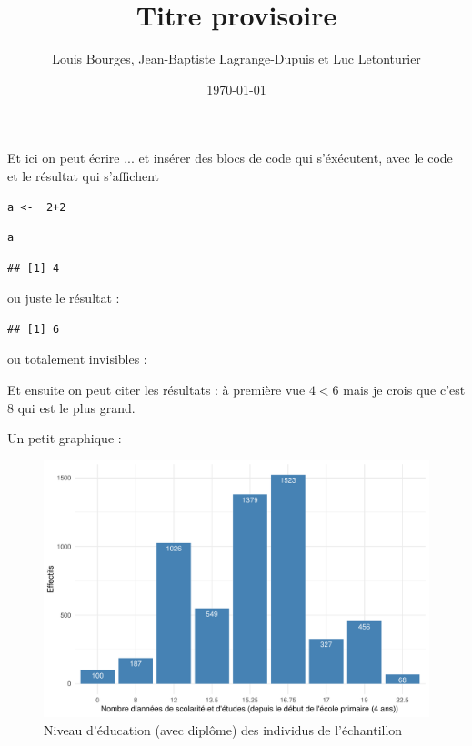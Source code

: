 \documentclass[a4paper, french, 11 pt]{article}\usepackage[]{graphicx}\usepackage[]{xcolor}
\title{Titre provisoire}
\author{Louis Bourges, Jean-Baptiste Lagrange-Dupuis et Luc Letonturier}
\date{\today}
\makeatletter
\newenvironment{kframe}{%
 \def\at@end@of@kframe{}%
 \ifinner\ifhmode%
  \def\at@end@of@kframe{\end{minipage}}%
  \begin{minipage}{\columnwidth}%
 \fi\fi%
 \def\FrameCommand##1{\hskip\@totalleftmargin \hskip-\fboxsep
 \colorbox{shadecolor}{##1}\hskip-\fboxsep
     \hskip-\linewidth \hskip-\@totalleftmargin \hskip\columnwidth}%
 \MakeFramed {\advance\hsize-\width
   \@totalleftmargin\z@ \linewidth\hsize
   \@setminipage}}%
 {\par\unskip\endMakeFramed%
 \at@end@of@kframe}
\newenvironment{knitrout}{}{} %
\makeatother
\begin{document}
\maketitle

Et ici on peut écrire ... et insérer des blocs de code qui s'éxécutent, avec le code et le résultat qui s'affichent

\begin{knitrout}
\color{fgcolor}\begin{kframe}
\begin{lstlisting}[basicstyle=\ttfamily,breaklines=true]
a <-  2+2\end{lstlisting}
\begin{lstlisting}[basicstyle=\ttfamily,breaklines=true]
a\end{lstlisting}
\begin{lstlisting}[basicstyle=\ttfamily,breaklines=true]
## [1] 4
\end{lstlisting}
\end{kframe}
\end{knitrout}

ou juste le résultat : 

\begin{knitrout}
\color{fgcolor}\begin{kframe}
\begin{lstlisting}[basicstyle=\ttfamily,breaklines=true]
## [1] 6
\end{lstlisting}
\end{kframe}
\end{knitrout}

ou totalement invisibles : 


Et ensuite on peut citer les résultats : à première vue $4 < 6$ mais je crois que c'est 8 qui est le plus grand.


Un petit graphique : 



\begin{figure}[h]
\center
\includegraphics[width=0.7\linewidth]{figure/educ.pdf}
\caption{Niveau d'éducation (avec diplôme) des individus de l'échantillon}
\end{figure}
\end{document}
